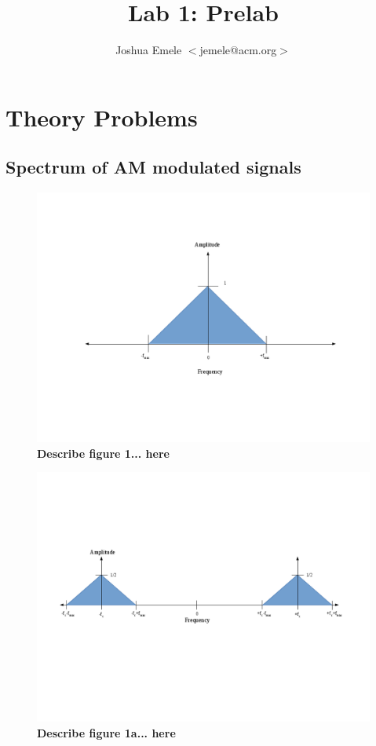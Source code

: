 \documentclass[letterpaper,12pt]{article}
\begin{document}
\title{Lab 1: Prelab}
\author{Joshua Emele $<$jemele@acm.org$>$}
\maketitle

\section{Theory Problems}

\subsection{Spectrum of AM modulated signals}
\begin{figure}[ht] 
\includegraphics[width=1.0\columnwidth]{prelab1-figure1}
\caption{
\label{fig:hw1-figure1}
{\bf Describe figure 1...
here}
}
\end{figure}

\begin{figure}[ht] 
\includegraphics[width=1.0\columnwidth]{prelab1-figure1a}
\caption{
\label{fig:hw1-figure1a}
{\bf Describe figure 1a...
here}
}
\end{figure}
\end{document}
